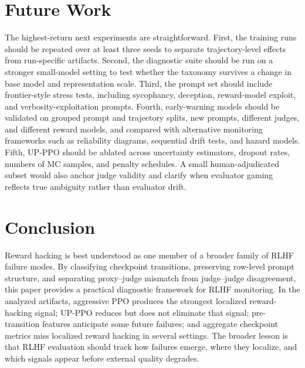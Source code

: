 \documentclass[11pt]{article}
\begin{document}
\section{Future Work}
The highest-return next experiments are straightforward. First, the training runs should be repeated over at least three seeds to separate trajectory-level effects from run-specific artifacts. Second, the diagnostic suite should be run on a stronger small-model setting to test whether the taxonomy survives a change in base model and representation scale. Third, the prompt set should include frontier-style stress tests, including sycophancy, deception, reward-model exploit, and verbosity-exploitation prompts. Fourth, early-warning models should be validated on grouped prompt and trajectory splits, new prompts, different judges, and different reward models, and compared with alternative monitoring frameworks such as reliability diagrams, sequential drift tests, and hazard models. Fifth, UP-PPO should be ablated across uncertainty estimators, dropout rates, numbers of MC samples, and penalty schedules. A small human-adjudicated subset would also anchor judge validity and clarify when evaluator gaming reflects true ambiguity rather than evaluator drift.

\section{Conclusion}
Reward hacking is best understood as one member of a broader family of RLHF failure modes. By classifying checkpoint transitions, preserving row-level prompt structure, and separating proxy--judge mismatch from judge--judge disagreement, this paper provides a practical diagnostic framework for RLHF monitoring. In the analyzed artifacts, aggressive PPO produces the strongest localized reward-hacking signal; UP-PPO reduces but does not eliminate that signal; pre-transition features anticipate some future failures; and aggregate checkpoint metrics miss localized reward hacking in several settings. The broader lesson is that RLHF evaluation should track how failures emerge, where they localize, and which signals appear before external quality degrades.
\end{document}
